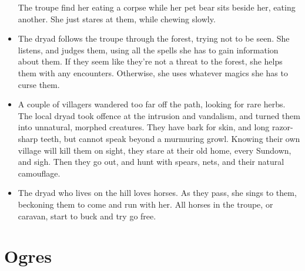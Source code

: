 \begin{multicols}{2}
\begin{itemize}
  The troupe find her eating a corpse while her pet bear sits beside her, eating another.
  She just stares at them, while chewing slowly.
  \item
  The dryad follows the troupe through the forest, trying not to be seen.
  She listens, and judges them, using all the spells she has to gain information about them.
  If they seem like they're not a threat to the forest, she helps them with any encounters.
  Otherwise, she uses whatever magics she has to curse them.
  \item
  A couple of villagers wandered too far off the path, looking for rare herbs.
  The local dryad took offence at the intrusion and vandalism, and turned them into unnatural, morphed creatures.
  They have bark for skin, and long razor-sharp teeth, but cannot speak beyond a murmuring growl.
  Knowing their own village will kill them on sight, they stare at their old home, every Sundown, and sigh.
  Then they go out, and hunt with spears, nets, and their natural camouflage.
  \item
  The dryad who lives on the hill loves horses.
  As they pass, she sings to them, beckoning them to come and run with her.
  All horses in the troupe, or caravan, start to buck and try go free.
\end{itemize}

\end{multicols}

\section[Ogre]{Ogres}
\label{ogre}


